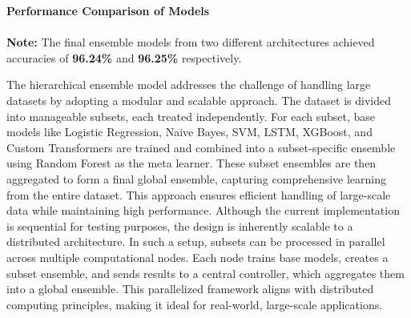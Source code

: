 \begin{center}
    \textbf{Performance Comparison of Models} \\[0.5em]
    \\[1em]
    \textbf{Note:} The final ensemble models from two different architectures achieved accuracies of \textbf{96.24\%} and \textbf{96.25\%} respectively.
\end{center}

\noindent
The hierarchical ensemble model addresses the challenge of handling large datasets by adopting a modular and scalable approach. The dataset is divided into manageable subsets, each treated independently. For each subset, base models like Logistic Regression, Naive Bayes, SVM, LSTM, XGBoost, and Custom Transformers are trained and combined into a subset-specific ensemble using Random Forest as the meta learner. These subset ensembles are then aggregated to form a final global ensemble, capturing comprehensive learning from the entire dataset. This approach ensures efficient handling of large-scale data while maintaining high performance. Although the current implementation is sequential for testing purposes, the design is inherently scalable to a distributed architecture. In such a setup, subsets can be processed in parallel across multiple computational nodes. Each node trains base models, creates a subset ensemble, and sends results to a central controller, which aggregates them into a global ensemble. This parallelized framework aligns with distributed computing principles, making it ideal for real-world, large-scale applications. 

